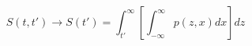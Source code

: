 \begin{equation}
S(t,t') \to S(t') = \int_{t'}^{\infty} \left[ \int_{-\infty}^\infty p(z,x) dx\right] dz
\end{equation}